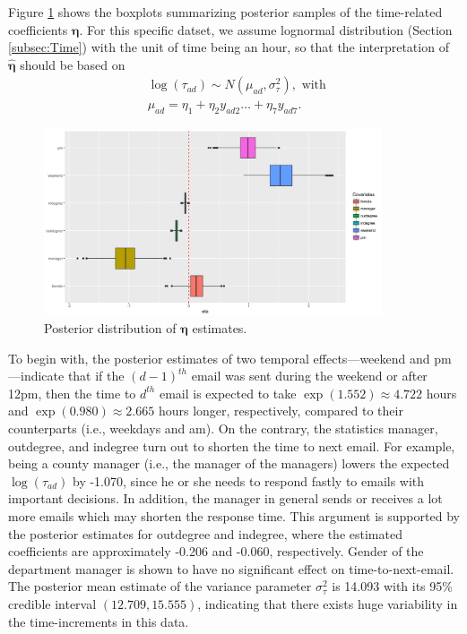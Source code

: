 \documentclass[12pt]{article}
\begin{document}
	Figure \ref{figure:etaresults} shows the boxplots summarizing posterior samples of the time-related coefficients $\boldsymbol{\eta}$. For this specific datset, we assume lognormal distribution (Section \ref{subsec:Time}) with the unit of time being an hour, so that the interpretation of $\hat{\boldsymbol{\eta}}$ should be based on
\begin{equation*}
\begin{aligned}
&\log(\tau_{ad}) \sim N(\mu_{ad}, \sigma_\tau^2), \mbox{ with }\\
&\mu_{ad} = \eta_{1}+\eta_{2} y_{ad2}\ldots+\eta_{7}y_{ad7}.
\end{aligned}
\end{equation*}
	\begin{figure}[!b]
		\centering
		\includegraphics[width=0.89\textwidth]{plots_paper/etaest-1.png}	
		\caption {Posterior distribution of $\boldsymbol{\eta}$ estimates.}
		\label{figure:etaresults}
	\end{figure}
To begin with, the posterior estimates of two temporal effects---weekend and pm---indicate that if the ${(d-1)}^{th}$ email was sent during the weekend or after 12pm, then the time to $d^{th}$ email is expected to take $\exp(1.552)\approx 4.722$ hours and $\exp(0.980)\approx2.665$ hours longer, respectively, compared to their counterparts (i.e., weekdays and am). On the contrary, the statistics manager, outdegree, and indegree turn out to shorten the time to next email. For example, being a county manager (i.e., the manager of the managers) lowers the expected $\log(\tau_{ad})$ by -1.070, since he or she needs to respond fastly to emails with important decisions. In addition, the manager in general sends or receives a lot more emails which may shorten the response time. This argument is supported by the posterior estimates for outdegree and indegree, where the estimated coefficients are approximately -0.206 and -0.060, respectively. Gender of the department manager is shown to have no significant effect on time-to-next-email. The posterior mean estimate of the variance parameter $\sigma^2_\tau$ is 14.093 with its 95\% credible interval $(12.709, 15.555)$, indicating that there exists huge variability in the time-increments in this data.
\end{document}
